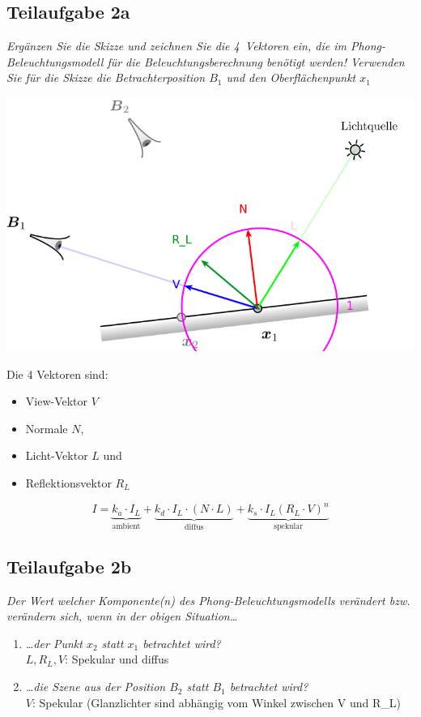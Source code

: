 \documentclass[a4paper]{scrartcl}
\begin{document}
\subsection*{Teilaufgabe 2a}
\textit{Ergänzen Sie die Skizze und zeichnen Sie die 4~Vektoren ein, die im
Phong-Beleuchtungsmodell für die Beleuchtungsberechnung benötigt werden!
Verwenden Sie für die Skizze die Betrachterposition $B_1$ und den
Oberflächenpunkt $x_1$}

\includegraphics*[width=0.8\linewidth, keepaspectratio]{2a.png}

Die 4 Vektoren sind:

\begin{itemize}
    \item View-Vektor $V$
    \item Normale $N$,
    \item Licht-Vektor $L$ und
    \item Reflektionsvektor $R_L$
\end{itemize}

\[I = \underbrace{k_a \cdot I_L}_{\text{ambient}} + \underbrace{k_d \cdot I_L \cdot (N \cdot L)}_{\text{diffus}} + \underbrace{k_s \cdot I_L (R_L \cdot V)^n}_{\text{spekular}}\]

\subsection*{Teilaufgabe 2b}
\textit{Der Wert welcher Komponente(n) des Phong-Beleuchtungsmodells verändert
bzw. verändern sich, wenn in der obigen Situation\dots}

\begin{enumerate}[label=(\roman*)]
    \item \textit{\dots der Punkt $x_2$ statt $x_1$ betrachtet wird?}\\
          $L, R_L, V$: Spekular und diffus
    \item \textit{\dots die Szene aus der Position $B_2$ statt $B_1$ betrachtet wird?}\\
          $V$: Spekular (Glanzlichter sind abhängig vom Winkel zwischen V und R_L)
\end{enumerate}
\end{document}
